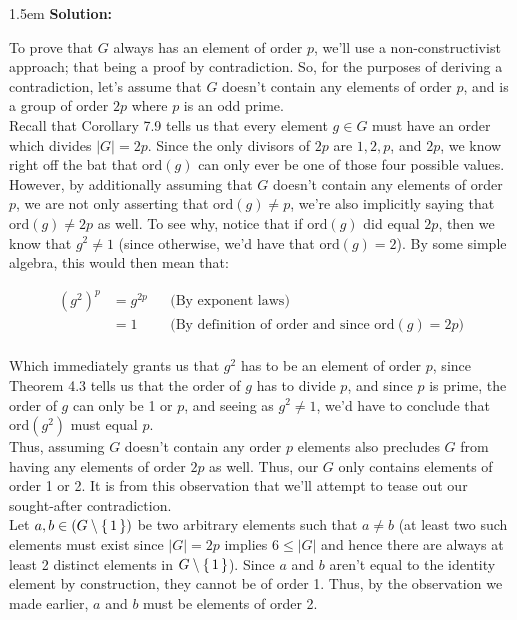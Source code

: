 \documentclass{article}
\newenvironment{solution}{
	\vspace{.5em}
	\par
	\begin{adjustwidth}{1.5em}{}
	\textbf{{Solution:}}
	\par
	\vspace{.5em}
}{
	\vspace{1em}
	\end{adjustwidth}
	\setcounter{step}{0}
	\newpage
}
\newcounter{step}
\newcommand{\ord}[1]{\text{ord}({#1})}
\begin{document}
\begin{solution}
	To prove that $G$ always has an element of order $p$, we'll use a non-constructivist approach; that being a proof by contradiction. So, for the purposes of deriving a contradiction, let's assume that $G$ doesn't contain any elements of order $p$, and is a group of order $2p$ where $p$ is an odd prime. \\

	Recall that Corollary 7.9 tells us that every element $g \in G$ must have an order which divides $|G| = 2p$. Since the only divisors of $2p$ are $1, 2, p$, and $2p$, we know right off the bat that $\ord{g}$ can only ever be one of those four possible values. \\

	However, by additionally assuming that $G$ doesn't contain any elements of order $p$, we are not only asserting that $\ord{g} \neq p$, we're also implicitly saying that $\ord{g} \neq 2p$ as well. To see why, notice that if $\ord{g}$ did equal $2p$, then we know that $g^{2} \neq 1$ (since otherwise, we'd have that $\ord{g} = 2$). By some simple algebra, this would then mean that:

	\begin{align*}
		(g^{2})^{p} &= g^{2p} &&\text{(By exponent laws)} \\
		&= 1 &&\text{(By definition of order and since $\ord{g} = 2p$)} \\
	\end{align*}

	Which immediately grants us that $g^{2}$ has to be an element of order $p$, since Theorem 4.3 tells us that the order of $g$ has to divide $p$, and since $p$ is prime, the order of $g$ can only be 1 or $p$, and seeing as $g^{2} \neq 1$, we'd have to conclude that $\ord{g^{2}}$ must equal $p$. \\

	Thus, assuming $G$ doesn't contain any order $p$ elements also precludes $G$ from having any elements of order $2p$ as well. Thus, our $G$ only contains elements of order 1 or 2. It is from this observation that we'll attempt to tease out our sought-after contradiction. \\

	Let $a, b \in (G \setminus \set{1})$ be two arbitrary elements such that $a \neq b$ (at least two such elements must exist since $|G| = 2p$ implies $6 \le |G|$ and hence there are always at least 2 distinct elements in $G \setminus \set{1}$). Since $a$ and $b$ aren't equal to the identity element by construction, they cannot be of order 1. Thus, by the observation we made earlier, $a$ and $b$ must be elements of order 2. \\


\end{solution}
\end{document}
